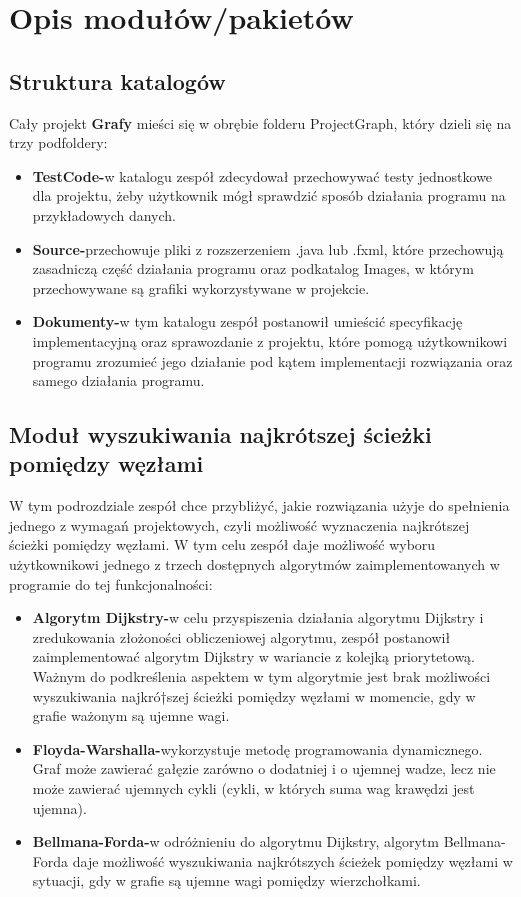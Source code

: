 \documentclass[10pt]{article}
\begin{document}
\section{Opis modułów/pakietów}
\subsection{Struktura katalogów}
Cały projekt \textbf{Grafy} mieści się w obrębie folderu ProjectGraph, który dzieli się na trzy podfoldery:
\begin{itemize}
    \item \textbf{TestCode-}w katalogu zespół zdecydował przechowywać testy jednostkowe dla projektu, żeby użytkownik mógł sprawdzić sposób działania programu na przykładowych danych.
    \item \textbf{Source-}przechowuje pliki z rozszerzeniem .java lub .fxml, które przechowują zasadniczą część działania programu oraz podkatalog Images, w którym przechowywane są grafiki wykorzystywane w projekcie.
    \item \textbf{Dokumenty-}w tym katalogu zespół postanowił umieścić specyfikację implementacyjną oraz sprawozdanie z projektu, które pomogą użytkownikowi programu zrozumieć jego działanie pod kątem implementacji rozwiązania oraz samego działania programu.
\end{itemize}
\subsection{Moduł wyszukiwania najkrótszej ścieżki pomiędzy węzłami}
W tym podrozdziale zespół chce przybliżyć, jakie rozwiązania użyje do spełnienia jednego z wymagań projektowych, czyli możliwość wyznaczenia najkrótszej ścieżki pomiędzy węzłami. W tym celu zespół daje możliwość wyboru użytkownikowi jednego z trzech dostępnych algorytmów zaimplementowanych w programie do tej funkcjonalności:
\begin{itemize}
    \item \textbf{Algorytm Dijkstry-}w celu przyspiszenia działania algorytmu Dijkstry i zredukowania złożoności obliczeniowej algorytmu, zespół postanowił zaimplementować algorytm Dijkstry w wariancie z kolejką priorytetową. Ważnym do podkreślenia aspektem w tym algorytmie jest brak możliwości wyszukiwania najkró†szej ścieżki pomiędzy węzłami w momencie, gdy w grafie ważonym są ujemne wagi.
    \item \textbf{Floyda-Warshalla-}wykorzystuje metodę programowania dynamicznego. Graf może zawierać gałęzie zarówno o dodatniej i o ujemnej wadze, lecz nie może zawierać ujemnych cykli (cykli, w których suma wag krawędzi jest ujemna).
    \item \textbf{Bellmana-Forda-}w odróżnieniu do algorytmu Dijkstry, algorytm Bellmana-Forda daje możliwość wyszukiwania najkrótszych ścieżek pomiędzy węzłami w sytuacji, gdy w grafie są ujemne wagi pomiędzy wierzchołkami.
\end{itemize}
\newpage
\end{document}
